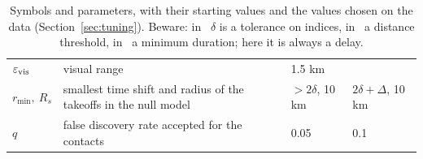 \begin{table}
\begin{tabularx}{\textwidth}{@{}l >{\raggedright\arraybackslash}X l l@{}}
$\varepsilon_{\mathrm{vis}}$ & visual range & 1.5 km & \\
$r_{\min},\ R_s$ & smallest time shift and radius of the takeoffs in the null model & $>2\delta$, 10 km & $2\delta+\Delta$, 10 km \\
$q$ & false discovery rate accepted for the contacts & 0.05 & 0.1 \\
\bottomrule
\end{tabularx}
\caption{Symbols and parameters, with their starting values and the values chosen on the data
(Section~\ref{sec:tuning}). Beware: in~\cite{vlachos2002}
$\delta$ is a tolerance on indices, in~\cite{joo2018} a distance threshold, in~\cite{buchin2015}
a minimum duration; here it is always a delay.}
\label{tab:notation}
\end{table}
